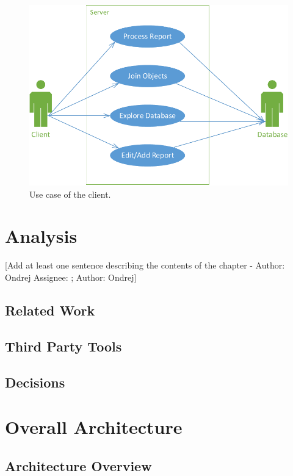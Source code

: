 \documentclass[12pt,a4paper]{report}
\makeatletter
\newcommand{\comment}[3][\@empty]{
  {\color{magenta}[#3 - }
  {\color{green}\ifx\@empty#1\relax Author: #2 \else Assignee: #1; Author: #2\fi}{\color{magenta}]}
}
\makeatother
\begin{document}
\begin{figure}[!htb]
        \centering
        \includegraphics[width=\textwidth]{Images/UseCase2}
        \caption{Use case of the client.}
        \label{fig:UseCase2}
\end{figure}

\chapter{Analysis}

\comment{Ondrej}{Add at least one sentence describing the contents of the
chapter}

\section{Related Work}


\section{Third Party Tools}


\section{Decisions}
\label{sec:Decisions}


\chapter{Overall Architecture}
\section{Architecture Overview}

\end{document}
